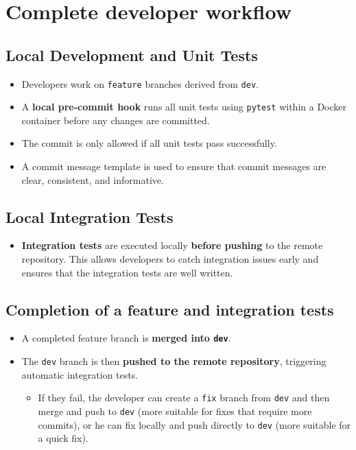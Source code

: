 \clearpage

\section{Complete developer workflow}

\subsection{Local Development and Unit Tests}

\begin{itemize}
    \item Developers work on \texttt{feature} branches derived from \texttt{dev}.
    \item A \textbf{local pre-commit hook} runs all unit tests using \texttt{pytest} within a Docker container before any changes are committed.
    \item The commit is only allowed if all unit tests pass successfully.
    \item A commit message template is used to ensure that commit messages are clear, consistent, and informative.
\end{itemize}

\subsection{Local Integration Tests}

\begin{itemize}
    \item \textbf{Integration tests} are executed locally \textbf{before pushing} to the remote repository. This allows developers to catch integration issues early and ensures that the integration tests are well written.
\end{itemize}

\subsection{Completion of a feature and integration tests}

\begin{itemize}
    \item A completed feature branch is \textbf{merged into \texttt{dev}}.
    \item The \texttt{dev} branch is then \textbf{pushed to the remote repository}, triggering automatic integration tests. 
    \begin{itemize}
        \item If they fail, the developer can create a \texttt{fix} branch from \texttt{dev} and then merge and push to \texttt{dev} (more suitable for fixes that require more commits), or he can fix locally and push directly to \texttt{dev} (more suitable for a quick fix).
    \end{itemize}
\end{itemize}

